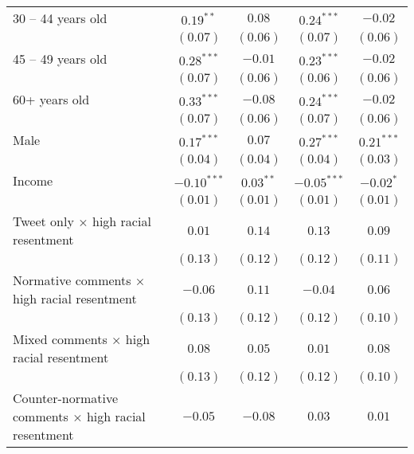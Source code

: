 \begin{table}[h!]
\begin{center}
\begin{scriptsize}
\begin{tabular}{l c c c c}
30 -- 44 years old                                  & $0.19^{**}$   & $0.08$        & $0.24^{***}$  & $-0.02$      \\
                                                    & $(0.07)$      & $(0.06)$      & $(0.07)$      & $(0.06)$     \\
45 -- 49 years old                                  & $0.28^{***}$  & $-0.01$       & $0.23^{***}$  & $-0.02$      \\
                                                    & $(0.07)$      & $(0.06)$      & $(0.06)$      & $(0.06)$     \\
60+ years old                                       & $0.33^{***}$  & $-0.08$       & $0.24^{***}$  & $-0.02$      \\
                                                    & $(0.07)$      & $(0.06)$      & $(0.07)$      & $(0.06)$     \\
Male                                                & $0.17^{***}$  & $0.07$        & $0.27^{***}$  & $0.21^{***}$ \\
                                                    & $(0.04)$      & $(0.04)$      & $(0.04)$      & $(0.03)$     \\
Income                                              & $-0.10^{***}$ & $0.03^{**}$   & $-0.05^{***}$ & $-0.02^{*}$  \\
                                                    & $(0.01)$      & $(0.01)$      & $(0.01)$      & $(0.01)$     \\
Tweet only × high racial resentment                 & $0.01$        & $0.14$        & $0.13$        & $0.09$       \\
                                                    & $(0.13)$      & $(0.12)$      & $(0.12)$      & $(0.11)$     \\
Normative comments × high racial resentment         & $-0.06$       & $0.11$        & $-0.04$       & $0.06$       \\
                                                    & $(0.13)$      & $(0.12)$      & $(0.12)$      & $(0.10)$     \\
Mixed comments × high racial resentment             & $0.08$        & $0.05$        & $0.01$        & $0.08$       \\
                                                    & $(0.13)$      & $(0.12)$      & $(0.12)$      & $(0.10)$     \\
Counter-normative comments × high racial resentment & $-0.05$       & $-0.08$       & $0.03$        & $0.01$       \\

\end{tabular}
\end{scriptsize}
\end{center}
\end{table}
